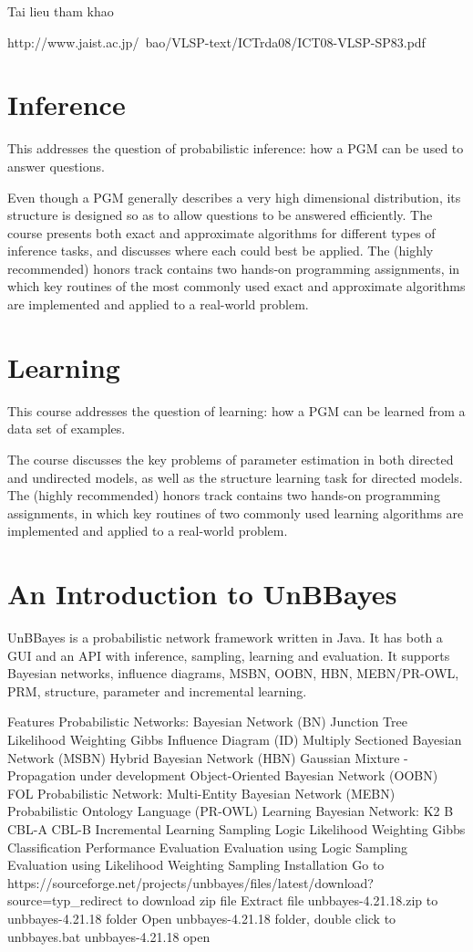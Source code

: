 Tai lieu tham khao

http://www.jaist.ac.jp/~bao/VLSP-text/ICTrda08/ICT08-VLSP-SP83.pdf


\section{Inference}

This addresses the question of probabilistic inference: how a PGM can be used to answer questions.

Even though a PGM generally describes a very high dimensional distribution, its structure is designed so as to allow questions to be answered efficiently. The course presents both exact and approximate algorithms for different types of inference tasks, and discusses where each could best be applied. The (highly recommended) honors track contains two hands-on programming assignments, in which key routines of the most commonly used exact and approximate algorithms are implemented and applied to a real-world problem.

\section{Learning}

This course addresses the question of learning: how a PGM can be learned from a data set of examples.

The course discusses the key problems of parameter estimation in both directed and undirected models, as well as the structure learning task for directed models. The (highly recommended) honors track contains two hands-on programming assignments, in which key routines of two commonly used learning algorithms are implemented and applied to a real-world problem.

\section{An Introduction to UnBBayes}

UnBBayes is a probabilistic network framework written in Java. It has both a GUI and an API with inference, sampling, learning and evaluation. It supports Bayesian networks, influence diagrams, MSBN, OOBN, HBN, MEBN/PR-OWL, PRM, structure, parameter and incremental learning.

Features
Probabilistic Networks:
Bayesian Network (BN)
Junction Tree
Likelihood Weighting
Gibbs
Influence Diagram (ID)
Multiply Sectioned Bayesian Network (MSBN)
Hybrid Bayesian Network (HBN)
Gaussian Mixture - Propagation under development
Object-Oriented Bayesian Network (OOBN)
FOL Probabilistic Network:
Multi-Entity Bayesian Network (MEBN)
Probabilistic Ontology Language (PR-OWL)
Learning Bayesian Network:
K2
B
CBL-A
CBL-B
Incremental Learning
Sampling
Logic
Likelihood Weighting
Gibbs
Classification Performance Evaluation
Evaluation using Logic Sampling
Evaluation using Likelihood Weighting Sampling
Installation
Go to https://sourceforge.net/projects/unbbayes/files/latest/download?source=typ_redirect to download zip file
Extract file unbbayes-4.21.18.zip to unbbayes-4.21.18 folder
Open unbbayes-4.21.18 folder, double click to unbbayes.bat
unbbayes-4.21.18 open

